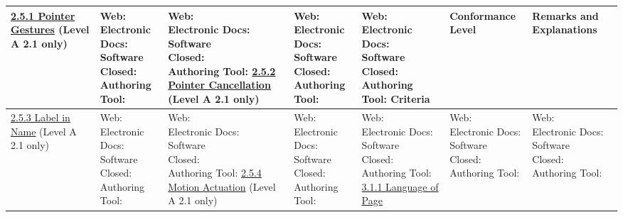 \documentclass[a4paper]{report}
\begin{document}
\begin{longtable}{|l|l|l|}
 	\hline
 	\href{https://www.w3.org/TR/WCAG21/#pointer-gestures}{2.5.1 Pointer Gestures} (Level A 2.1 only) & \makecell{Web: \\ Electronic Docs: \\ Software \\ Closed: \\ Authoring Tool:} & \makecell{Web: \\ Electronic Docs: \\ Software \\ Closed: \\ Authoring Tool:}
 	\hline
 	\href{https://www.w3.org/TR/WCAG21/#pointer-cancellation}{2.5.2 Pointer Cancellation} (Level A 2.1 only) & \makecell{Web: \\ Electronic Docs: \\ Software \\ Closed: \\ Authoring Tool:} & \makecell{Web: \\ Electronic Docs: \\ Software \\ Closed: \\ Authoring Tool:}
 	\hline \newpage \hline
 	Criteria & Conformance Level & Remarks and Explanations \\
 	\hline
 	\href{https://www.w3.org/TR/WCAG21/#label-in-name}{2.5.3 Label in Name} (Level A 2.1 only) & \makecell{Web: \\ Electronic Docs: \\ Software \\ Closed: \\ Authoring Tool:} & \makecell{Web: \\ Electronic Docs: \\ Software \\ Closed: \\ Authoring Tool:}
 	\hline
 	\href{https://www.w3.org/TR/WCAG21/#motion-actuation}{2.5.4 Motion Actuation} (Level A 2.1 only) & \makecell{Web: \\ Electronic Docs: \\ Software \\ Closed: \\ Authoring Tool:} & \makecell{Web: \\ Electronic Docs: \\ Software \\ Closed: \\ Authoring Tool:}
 	\hline
 	\href{http://www.w3.org/TR/WCAG20/#meaning-doc-lang-id}{3.1.1 Language of Page} & \makecell{Web: \\ Electronic Docs: \\ Software \\ Closed: \\ Authoring Tool:} & \makecell{Web: \\ Electronic Docs: \\ Software \\ Closed: \\ Authoring Tool:}

\end{longtable}
\end{document}

